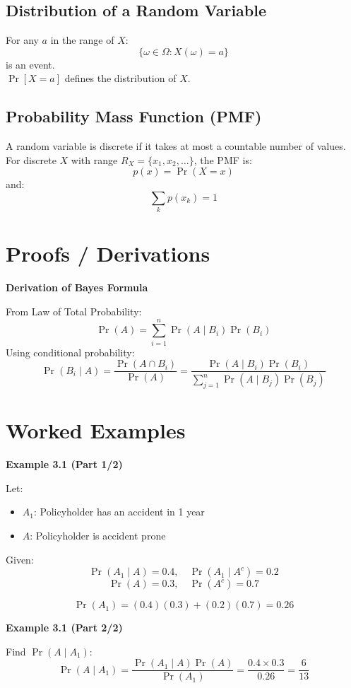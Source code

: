 \documentclass[12pt]{article}
\begin{document}
\subsection{Distribution of a Random Variable}
For any $a$ in the range of $X$:
\[
\{\omega \in \Omega : X(\omega) = a\}
\]
is an event. \\
$\Pr[X = a]$ defines the distribution of $X$.

\subsection{Probability Mass Function (PMF)}
A random variable is discrete if it takes at most a countable number of values. \\
For discrete $X$ with range $R_X = \{x_1, x_2, \dots\}$, the PMF is:
\[
p(x) = \Pr(X = x)
\]
and:
\[
\sum_k p(x_k) = 1
\]

\section{Proofs / Derivations}

\textbf{Derivation of Bayes Formula}

From Law of Total Probability:
\[
\Pr(A) = \sum_{i=1}^n \Pr(A \mid B_i)\Pr(B_i)
\]
Using conditional probability:
\[
\Pr(B_i \mid A)
= \frac{\Pr(A \cap B_i)}{\Pr(A)}
= \frac{\Pr(A \mid B_i)\Pr(B_i)}
{\sum_{j=1}^n \Pr(A \mid B_j)\Pr(B_j)}
\]

\section{Worked Examples}

\textbf{Example 3.1 (Part 1/2)}

Let:
\begin{itemize}[noitemsep]
\item $A_1$: Policyholder has an accident in 1 year
\item $A$: Policyholder is accident prone
\end{itemize}

Given:
\[
\Pr(A_1 \mid A) = 0.4, \quad
\Pr(A_1 \mid A^c) = 0.2
\]
\[
\Pr(A) = 0.3, \quad \Pr(A^c) = 0.7
\]

\[
\Pr(A_1) = (0.4)(0.3) + (0.2)(0.7) = 0.26
\]

\textbf{Example 3.1 (Part 2/2)}

Find $\Pr(A \mid A_1)$:
\[
\Pr(A \mid A_1) =
\frac{\Pr(A_1 \mid A)\Pr(A)}{\Pr(A_1)}
= \frac{0.4 \times 0.3}{0.26}
= \frac{6}{13}
\]
\end{document}
